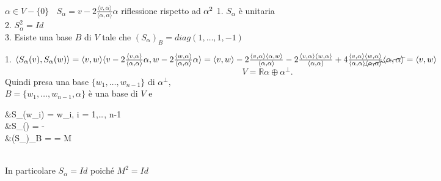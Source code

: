 \documentclass[12px]{article}
\begin{document}
	\hline \ \\
	\begin{prop}
$\displaystyle\alpha\in V\minus \{0\}  \ \ \ \ S_\alpha = v-2\frac{ \langle v, \alpha \rangle }{ \langle \alpha,\alpha \rangle} \alpha$ riflessione rispetto ad $\alpha^2\\$
1. $S_\alpha$ è unitaria\\
2. $S_\alpha^2 = Id$\\
3. Esiste una base $B$ di $V$ tale che 
$(S_\alpha)_B = diag(1,\ldots, 1, -1)$
\end{prop}
\begin{dimo}
	1. $ \langle S_\alpha (v), S_\alpha (w) \rangle  = \langle v, w \rangle \\
	\langle v -2\frac{ \langle v, \alpha \rangle }{ \langle \alpha,\alpha \rangle} \alpha,w  -2\frac{ \langle w, \alpha \rangle }{ \langle \alpha,\alpha \rangle} \alpha  \rangle  = \\
	\langle v, w \rangle   -2\frac{ \langle v, \alpha \rangle \langle \alpha, w \rangle }{ \langle \alpha,\alpha \rangle} -2\frac{ \langle v, \alpha \rangle \langle w, \alpha \rangle }{ \langle \alpha,\alpha \rangle}  + 4\frac{ \langle v, \alpha \rangle \langle w, \alpha \rangle }{ \langle \alpha,\alpha \rangle \cancel{\langle \alpha, \alpha \rangle} } \cancel{\langle \alpha, \alpha \rangle } = \langle v, w \rangle $\\
	\[
		V = \mathbb{R}\alpha \oplus \alpha^\perp
	.\] 
	Quindi presa una base $\{w_1,\ldots, w_{n-1}\}$ di $\alpha^\perp,$\\
	$B = \{w_1,\ldots,w_{n-1},\alpha\}  $ è una base di $V$ e\\
	\begin{aligned}
		&S_\alpha(w_i) = w_i, i = 1,\ldots, n-1\\
		&S_\alpha(\alpha) = -\alpha\\
		&(S_\alpha)_B =  = M
	\end{aligned}\\
	In particolare $S_\alpha = Id$ poiché $M^2 = Id$
\end{dimo}
\end{document}
